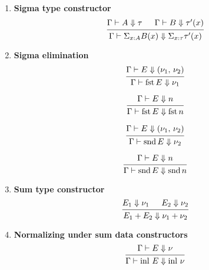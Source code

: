 \documentclass{article}
\begin{document}
\begin{enumerate}
  \item \textbf{Sigma type constructor} \\
    \[
      \begin{prooftree}
        \hypo{\Gamma \vdash A \Downarrow \tau}
        \hypo{\Gamma \vdash B \Downarrow \tau'(x)}
        \infer2{\Gamma \vdash \Sigma_{x : A}B(x) \Downarrow \Sigma_{x : \tau}\tau'(x)}
      \end{prooftree}
    \]

  \item \textbf{Sigma elimination} \\
   \[
    \begin{prooftree}
      \hypo{\Gamma \vdash E \Downarrow (\nu_1, \, \nu_2)}
      \infer1{\Gamma \vdash \fst E \Downarrow \nu_1}
    \end{prooftree}
  \]

  \[
   \begin{prooftree}
    \hypo{\Gamma \vdash E \Downarrow n}
     \infer1{\Gamma \vdash \fst E \Downarrow \fst n}
   \end{prooftree}
  \]

  \[
    \begin{prooftree}
      \hypo{\Gamma \vdash E \Downarrow (\nu_1, \, \nu_2)}
      \infer1{\Gamma \vdash \snd E \Downarrow \nu_2}
    \end{prooftree}
  \]

  \[
   \begin{prooftree}
     \hypo{\Gamma \vdash E \Downarrow n}
     \infer1{\Gamma \vdash \snd E \Downarrow \snd n}
   \end{prooftree}
  \]


  \item \textbf{Sum type constructor}
  \[
    \begin{prooftree}
      \hypo{E_1 \Downarrow \nu_1}
      \hypo{E_2 \Downarrow \nu_2}
      \infer2{E_1 + E_2 \Downarrow \nu_1 + \nu_2}
    \end{prooftree}
  \]

  \item \textbf{Normalizing under sum data constructors}
  \[
    \begin{prooftree}
      \hypo{\Gamma \vdash E \Downarrow \nu}
      \infer1{\Gamma \vdash \inl \, E \Downarrow \inl \, \nu}
    \end{prooftree}  
  \]


\end{enumerate}
\end{document}

